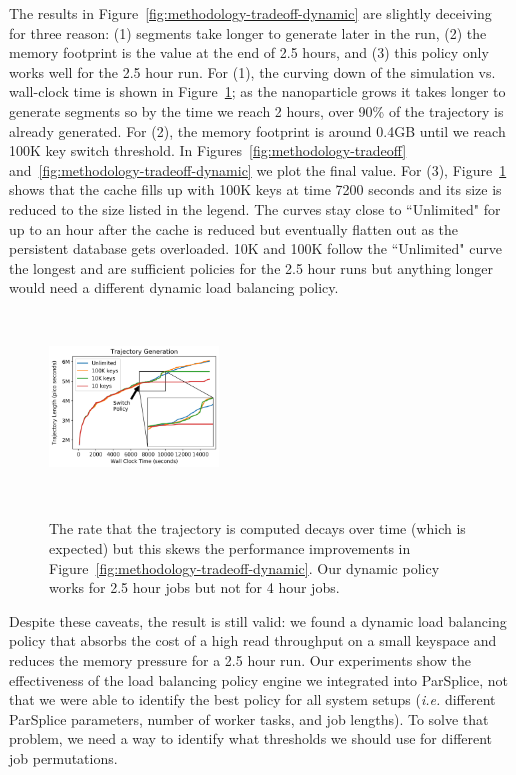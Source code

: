 The results in Figure~\ref{fig:methodology-tradeoff-dynamic} are slightly
deceiving for three reason: (1) segments take longer to generate later in the
run, (2) the memory footprint is the value at the end of 2.5 hours, and (3)
this policy only works well for the 2.5 hour run.  For (1), the curving down of
the simulation vs. wall-clock time is shown in
Figure~\ref{fig:methodology-trajectory}; as the nanoparticle grows it takes
longer to generate segments so by the time we reach 2 hours, over 90\% of the
trajectory is already generated.  For (2), the memory footprint is around 0.4GB
until we reach 100K key switch threshold. In
Figures~\ref{fig:methodology-tradeoff}
and~\ref{fig:methodology-tradeoff-dynamic} we plot the final value. For (3),
Figure~\ref{fig:methodology-trajectory} shows that the cache fills up with 100K
keys at time 7200 seconds and its size is reduced to the size listed in the
legend.  The curves stay close to ``Unlimited" for up to an hour after the
cache is reduced but eventually flatten out as the persistent database gets
overloaded. 10K and 100K follow the ``Unlimited" curve the longest and are
sufficient policies for the 2.5 hour runs but anything longer would need a
different dynamic load balancing policy.

\begin{figure}[t]
  \noindent\includegraphics[height=5cm,width=0.4\textwidth]{figures/methodology-trajectory.png}\\
  \caption{The rate that the trajectory is computed decays over time (which is
  expected) but this skews the performance improvements in
  Figure~\ref{fig:methodology-tradeoff-dynamic}. Our dynamic policy works for 2.5
  hour jobs but not for 4 hour jobs.  \label{fig:methodology-trajectory}}
\end{figure}

Despite these caveats, the result is still valid: we found a dynamic load
balancing policy that absorbs the cost of a high read throughput on a small
keyspace and reduces the memory pressure for a 2.5 hour run. Our experiments
show the effectiveness of the load balancing policy engine we integrated into
ParSplice, not that we were able to identify the best policy for all system
setups ({\it i.e.} different ParSplice parameters, number of worker tasks, and
job lengths).  To solve that problem, we need a way to identify what thresholds
we should use for different job permutations.

